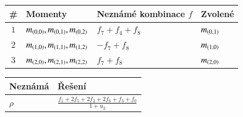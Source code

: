 \begin{table}[!h]
	\centering
	\begin{tabular}{c l l l}
		\toprule
		\# & Momenty & Neznámé kombinace $f$ & Zvolené\\
		\midrule
		\multirow{ 1}{*}{$1$} & \multirow{ 1}{*}{$m_{\left(0,0\right)}, m_{\left(0,1\right)}, m_{\left(0,2\right)}$} & $f_7+f_4+f_8$ & \multirow{ 1}{*}{$m_{\left(0,1\right)}$}\\ 
		\midrule
		\multirow{ 1}{*}{$2$} & \multirow{ 1}{*}{$m_{\left(1,0\right)}, m_{\left(1,1\right)}, m_{\left(1,2\right)}$} & $-f_7+f_8$ & \multirow{ 1}{*}{$m_{\left(1,0\right)}$}\\ 
		\midrule
		\multirow{ 1}{*}{$3$} & \multirow{ 1}{*}{$m_{\left(2,0\right)}, m_{\left(2,1\right)}, m_{\left(2,2\right)}$} & $f_7+f_8$ & \multirow{ 1}{*}{$m_{\left(2,0\right)}$}\\ 
		\bottomrule
\end{tabular}\end{table}

\begin{table}[!h]
	\centering
	\begin{tabular}{l l}
		\toprule
		Neznámá & Řešení\\
		\midrule
		$\rho$ & $\frac{f_1+2 f_5+2 f_2+2 f_6+f_3+f_0}{1+u_2}$ \\ 
		\bottomrule
\end{tabular}\end{table}

